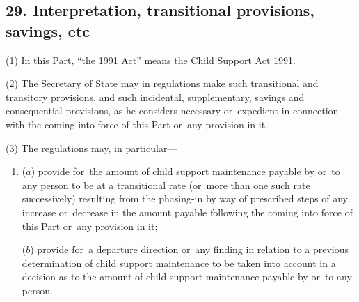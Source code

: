 \documentclass[12pt,a4paper]{article}
\begin{document}
%
%
%
%
%
%
%
%
%
%
%
%

\subsection{29. Interpretation, transitional provisions, savings, etc}

(1) In this Part, “the 1991 Act” means the Child Support Act 1991. 

(2) The Secretary of State may in regulations make such transitional and transitory provisions, and such incidental, supplementary, savings and consequential provisions, as he considers necessary or~expedient in connection with the coming into force of this Part or~any provision in it.

(3) The regulations may, in particular—
\begin{enumerate}\item[]
($a$) provide for~the amount of child support maintenance payable by or~to any person to be at a transitional rate (or~more than one such rate successively) resulting from the phasing-in by way of prescribed steps of any increase or~decrease in the amount payable following the coming into force of this Part or~any provision in it;

($b$) provide for~a departure direction or~any finding in relation to a previous determination of child support maintenance to be taken into account in a decision as to the amount of child support maintenance payable by or~to any person.
\end{enumerate}
\end{document}
